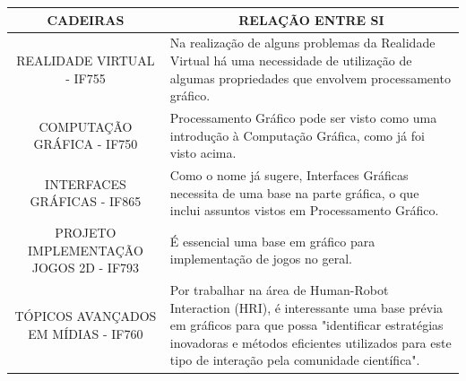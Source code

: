 \documentclass[10 pt,a4paper]{article}
\begin{document}
\begin{table}[H]
\centering
\begin{tabular}{@{}|l p{7cm}|@{}}
\toprule
\multicolumn{1}{|c|}{\textbf{CADEIRAS}}                                                 &\multicolumn{1}{|c|}{\textbf{RELAÇÃO ENTRE SI}}                                                                                                                                                                                                                                                                                                                \\ \midrule
\multicolumn{1}{|c|}{REALIDADE VIRTUAL - IF755} & Na realização de alguns problemas da Realidade Virtual há uma necessidade de utilização de algumas propriedades que envolvem processamento gráfico.                                                                                                                                                                                                            \\ \midrule
\multicolumn{1}{|c|}{COMPUTAÇÃO GRÁFICA - IF750}                                               & Processamento Gráfico pode ser visto como uma introdução à Computação Gráfica, como já foi visto acima.                                                                                                                                                                                                                                                        \\ \midrule
\multicolumn{1}{|c|}{INTERFACES GRÁFICAS - IF865}                                              & Como o nome já sugere, Interfaces Gráficas necessita de uma base na parte gráfica, o que inclui assuntos vistos em Processamento Gráfico.                                                                                                                                                                                                                      \\ \midrule
\multicolumn{1}{|c|}{PROJETO IMPLEMENTAÇÃO JOGOS 2D - IF793}                                   & É essencial uma base em gráfico para implementação de jogos no geral.                                                                                                                                                                                                                                                                                          \\ \midrule
\multicolumn{1}{|c|}{TÓPICOS AVANÇADOS EM MÍDIAS - IF760}                                      & Por trabalhar na área de Human-Robot Interaction (HRI), é interessante uma base prévia em gráficos para que possa "identificar estratégias inovadoras e métodos eficientes utilizados para este tipo de interação pela comunidade científica".                                                                                                                 \\ \midrule

\end{tabular}
\end{table}
\end{document}
